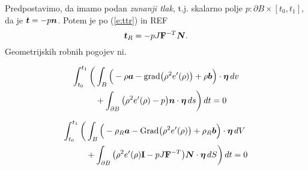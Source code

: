 Predpostavimo, da imamo podan \emph{zunanji tlak}, t.j. skalarno polje $p\colon\partial B\times[t_0,t_1]$,
da je $\boldsymbol t=-p\boldsymbol n$. Potem je po (\ref{e:ttr}) in REF
\[ \boldsymbol t_R=-pJ\mathbf F^{-T}\boldsymbol N. \]
Geometrijskih robnih pogojev ni.

\begin{align*}
	\int_{t_0}^{t_1}\bigg( &\int_{B}\Big(-\rho\boldsymbol a-\mathrm{grad}\big(\rho^2 e'(\rho)\big)+\rho\boldsymbol b\Big)\cdot\boldsymbol \eta\,dv \\
	&+\int_{\partial B}\big(\rho^2 e'(\rho)-p\big)\boldsymbol n\cdot\boldsymbol \eta\,ds\bigg)\,dt=0
\end{align*}

\begin{align*}
	\int_{t_0}^{t_1}\bigg( &\int_{B}\Big(-\rho_R\boldsymbol a-\mathrm{Grad}\big(\rho^2 e'(\rho)\big)+\rho_R\boldsymbol b\Big)\cdot\boldsymbol \eta\,dV \\
	&+\int_{\partial B}\big(\rho^2 e'(\rho)\mathbf I-pJ\mathbf F^{-T}\big)\boldsymbol N\cdot\boldsymbol \eta\,dS\bigg)\,dt=0
\end{align*}